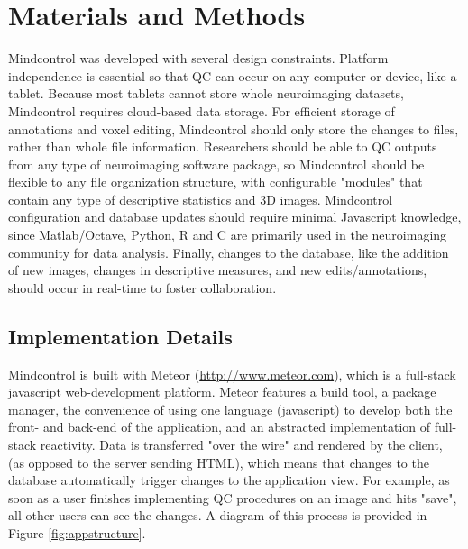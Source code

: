 \section{Materials and Methods}

Mindcontrol was developed with several design constraints. Platform independence is essential so that QC can occur on any computer or device, like a tablet. Because most tablets cannot store whole neuroimaging datasets, Mindcontrol requires cloud-based data storage. For efficient storage of annotations and voxel editing, Mindcontrol should only store the changes to files, rather than whole file information. Researchers should be able to QC outputs from any type of neuroimaging software package, so Mindcontrol should be flexible to any file organization structure, with configurable "modules" that contain any type of descriptive statistics and 3D images. Mindcontrol configuration and database updates should require minimal Javascript knowledge, since Matlab/Octave, Python, R and C are primarily used in the neuroimaging community for data analysis. Finally, changes to the database, like the addition of new images, changes in descriptive measures, and new edits/annotations, should occur in real-time to foster collaboration.  


\subsection{Implementation Details}

Mindcontrol is built with Meteor (\href{http://www.meteor.com}{http://www.meteor.com}), which is a full-stack javascript web-development platform. Meteor features a build tool, a package manager, the convenience of using one language (javascript) to develop both the front- and back-end of the application, and an abstracted implementation of full-stack reactivity. Data is transferred "over the wire" and rendered by the client, (as opposed to the server sending HTML), which means that changes to the database automatically trigger changes to the application view. For example, as soon as a user finishes implementing QC procedures on an image and hits "save", all other users can see the changes. A diagram of this process is provided in Figure \ref{fig:appstructure}.



